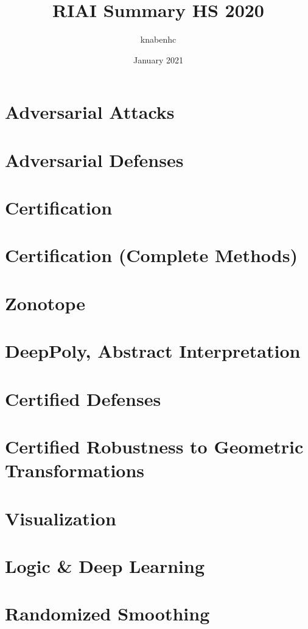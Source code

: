 \documentclass[11pt]{article}
\title{RIAI Summary HS 2020}
\author{knabenhc }
\date{January 2021}
\begin{document}
\pagestyle{empty}
\begin{multicols*}{3}
\section*{Adversarial Attacks}
\section*{Adversarial Defenses}
\section*{Certification}
\section*{Certification (Complete Methods)}
\section*{Zonotope}
\section*{DeepPoly, Abstract Interpretation}
\section*{Certified Defenses}
\section*{Certified Robustness to Geometric Transformations}
\section*{Visualization}
\section*{Logic \& Deep Learning}
\section*{Randomized Smoothing}
\end{multicols*}
\end{document}
